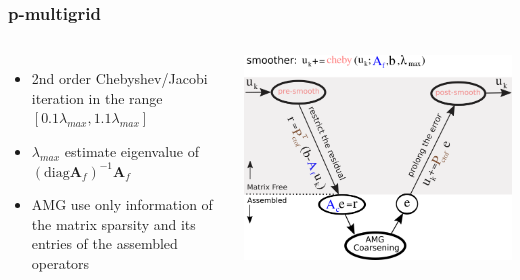 \documentclass[aspectratio=169,xcolor=dvipsnames]{beamer}
\begin{document}

\begin{frame}
    \frametitle{p-multigrid}
    \begin{columns}[c] %
    {\large
    \begin{itemize}
    \item 2nd order Chebyshev/Jacobi iteration in the range $[0.1\lambda_{max}, 1.1\lambda_{max}]$
    \item $\lambda_{max}$ estimate eigenvalue of $\left(\text{diag}\boldsymbol{A}_f \right)^{-1}\boldsymbol{A}_f$
    \item AMG use only information of the matrix sparsity and its entries of the assembled operators
    \end{itemize}
    }
    \centering
    \includegraphics[width =0.95\linewidth]{figures/p-multigrid-cycle.png}
    \end{columns}

\end{frame}

\end{document}

